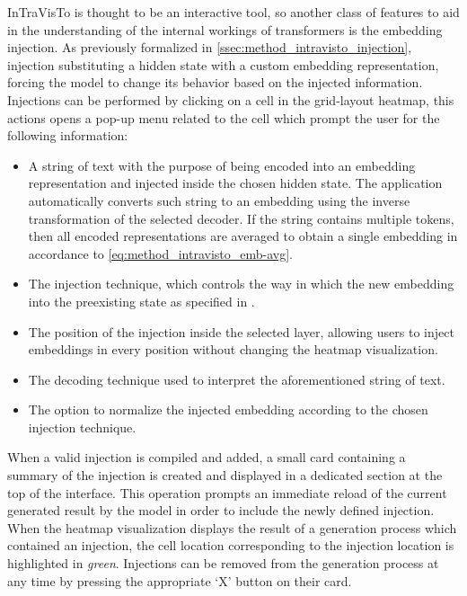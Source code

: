 InTraVisTo is thought to be an interactive tool, so another class of features to aid in the understanding of the internal workings of transformers is the embedding injection.
As previously formalized in \cref{ssec:method_intravisto_injection}, injection  substituting a hidden state with a custom embedding representation, forcing the model to change its behavior based on the injected information.
Injections can be performed by clicking on a cell in the grid-layout heatmap, this actions opens a pop-up menu related to the cell which prompt the user for the following information:
\begin{itemize}
    \item A string of text with the purpose of being encoded into an embedding representation and injected inside the chosen hidden state.
The application automatically converts such string to an embedding using the inverse transformation of the selected decoder.
If the string contains multiple tokens, then all encoded representations are averaged to obtain a single embedding in accordance to \cref{eq:method_intravisto_emb-avg}.
    \item The injection technique, which controls the way in which the new embedding  into the preexisting state as specified in .
    \item The position of the injection inside the selected layer, allowing users to inject embeddings in every position without changing the heatmap visualization.
    \item The decoding technique used to interpret the aforementioned string of text.
    \item The option to normalize the injected embedding according to the chosen injection technique. 
\end{itemize}

When a valid injection is compiled and added, a small card containing a summary of the injection is created and displayed in a dedicated section at the top of the interface.
This operation prompts an immediate reload of the current generated result by the model in order to include the newly defined injection.
When the heatmap visualization displays the result of a generation process which contained an injection, the cell location corresponding to the injection location is highlighted in \textit{green}.
Injections can be removed from the generation process at any time by pressing the appropriate `X' button on their card.


